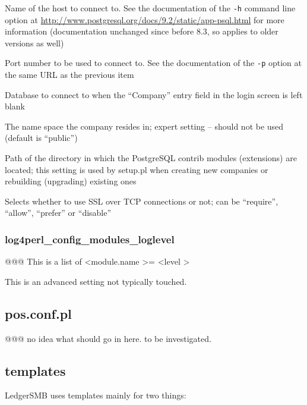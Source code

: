 \begin{description}[style=nextline]
\item [host] Name of the host to connect to. See the documentation of the {\tt -h} command line option at 
   \url{http://www.postgresql.org/docs/9.2/static/app-psql.html}
   for more information (documentation unchanged since before 8.3, so applies to older versions as well)
\item [port] Port number to be used to connect to. See the documentation of the {\tt -p} option at the
   same URL as the previous item
\item [default\_db] Database to connect to when the ``Company'' entry field in the login screen is left blank
\item [db\_namespace] The name space the company resides in; expert setting -- should not be used (default is
   ``public'')
\item [contrib\_dir] Path of the directory in which the PostgreSQL contrib modules (extensions) are
   located; this setting is used by setup.pl when creating new companies or rebuilding (upgrading)
   existing ones
\item [sslmode] Selects whether to use \gls{SSL} over TCP connections or not; can be ``require'', ``allow'',
   ``prefer'' or ``disable''
\end{description}

\subsubsection{log4perl\_config\_modules\_loglevel}
\label{subsubsec-global-config-ledgersmb-conf-log4perl}

@@@ This is a list of \textless module.name \textgreater = \textless level \textgreater

This is an advanced setting not typically touched.


\subsection{pos.conf.pl}
\label{subsec-global-config-pos-conf}


@@@ no idea what should go in here. to be investigated.

\subsection{templates}
\label{subsec-global-config-templates}

LedgerSMB uses templates mainly for two things:

